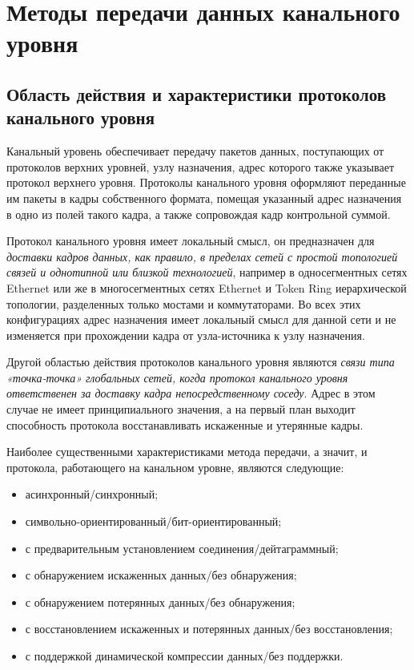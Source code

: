 \chapter{Методы передачи данных канального уровня}

\section{Область действия и характеристики протоколов канального уровня}

Канальный уровень обеспечивает передачу пакетов данных, поступающих от протоколов верхних уровней, узлу назначения, адрес которого также указывает протокол верхнего уровня.
Протоколы канального уровня оформляют переданные им пакеты в кадры собственного формата, помещая указанный адрес назначения в одно из полей такого кадра, а также сопровождая кадр контрольной суммой.

Протокол канального уровня имеет локальный смысл, он предназначен для \emph{доставки кадров данных, как правило, в пределах сетей с простой  топологией связей и однотипной или близкой технологией}, например в односегментных сетях Ethernet или же в многосегментных сетях Ethernet и Token Ring иерархической топологии, разделенных только мостами и коммутаторами.
Во всех этих конфигурациях адрес назначения имеет локальный смысл для данной сети и не изменяется при прохождении кадра от узла-источника к узлу назначения.

Другой областью действия протоколов канального уровня являются \emph{связи типа «точка-точка» глобальных сетей, когда протокол канального уровня ответственен за доставку кадра непосредственному соседу}.
Адрес в этом случае не имеет принципиального значения, а на первый план выходит способность протокола восстанавливать искаженные и утерянные кадры.

Наиболее существенными характеристиками метода передачи, а значит, и протокола, работающего на канальном уровне, являются следующие:
\begin{itemize}
    \item асинхронный/синхронный;
    \item символьно-ориентированный/бит-ориентированный;
    \item с предварительным установлением соединения/дейтаграммный;
    \item с обнаружением искаженных данных/без обнаружения;
    \item с обнаружением потерянных данных/без обнаружения;
    \item с восстановлением искаженных и потерянных данных/без восстановления;
    \item с поддержкой динамической компрессии данных/без поддержки.
\end{itemize}

